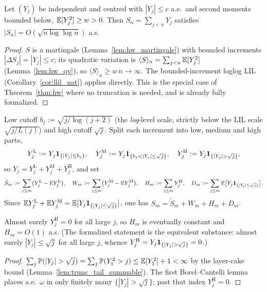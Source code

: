 \begin{corollary}\label{cor:hw_bounded}
Let $(Y_j)$ be independent and centred with $|Y_j|\le c$ a.e.\ and second moments bounded below,
$\mathbb{E}[Y_j^2]\ge w>0$. Then $S_n=\sum_{j<n}Y_j$ satisfies $|S_n|=O(\sqrt{n\log\log n})$ a.s.
\end{corollary}
\begin{proof}
$S$ is a martingale (Lemma~\ref{lem:hw_martingale}) with bounded increments $|\Delta S_j|=|Y_j|\le c$;
its quadratic variation is $\langle S\rangle_n=\sum_{j<n}\mathbb{E}[Y_j^2]$ (Lemma~\ref{lem:hw_qv}), so
$\langle S\rangle_n\ge w\,n\to\infty$. The bounded-increment loglog LIL
(Corollary~\ref{cor:llil_nat}) applies directly. This is the special case of
Theorem~\ref{thm:hw} where no truncation is needed, and is already fully formalized.
\end{proof}

\begin{definition}\label{def:hw_trunc}
Low cutoff $b_j:=\sqrt{j/\log(j+2)}$ (the \emph{log}-level scale, strictly below the LIL
scale $\sqrt{j/L(j)}$) and high cutoff $\sqrt j$. Split each increment into low, medium and
high parts,
\[
  Y_j^{\mathrm L}:=Y_j\indic_{\{|Y_j|\le b_j\}},\quad
  Y_j^{\mathrm M}:=Y_j\indic_{\{b_j<|Y_j|\le\sqrt j\}},\quad
  Y_j^{\mathrm H}:=Y_j\indic_{\{|Y_j|>\sqrt j\}},
\]
so $Y_j=Y_j^{\mathrm L}+Y_j^{\mathrm M}+Y_j^{\mathrm H}$, and set
\[
  \tilde S_m:=\sum_{j\le m}\!\big(Y_j^{\mathrm L}-\mathbb{E} Y_j^{\mathrm L}\big),\quad
  W_m:=\sum_{j\le m}\!\big(Y_j^{\mathrm M}-\mathbb{E} Y_j^{\mathrm M}\big),\quad
  H_m:=\sum_{j\le m}Y_j^{\mathrm H},\quad
  D_m:=\sum_{j\le m}\mathbb{E}\big[Y_j\mathbf{1}_{\{|Y_j|\le\sqrt j\}}\big].
\]
Since $\mathbb{E} Y_j^{\mathrm L}+\mathbb{E} Y_j^{\mathrm M}=\mathbb{E}[Y_j\mathbf{1}_{\{|Y_j|\le\sqrt j\}}]$, one has
$S_m=\tilde S_m+W_m+H_m+D_m$.
\end{definition}

\begin{lemma}\label{lem:hw_high}
\leanok
{}
Almost surely $Y_j^{\mathrm H}=0$ for all large $j$, so $H_m$ is eventually constant and
$H_m=O(1)$ a.s. (The formalized statement is the equivalent substance: almost surely
$|Y_j|\le\sqrt j$ for all large $j$, whence $Y_j^{\mathrm H}=Y_j\indic_{\{|Y_j|>\sqrt j\}}=0$.)
\end{lemma}
\begin{proof}\leanok
$\sum_j\Prob(|Y_j|>\sqrt j)=\sum_j\Prob(Y_1^2>j)\le\E[Y_1^2]+1<\infty$ by the layer-cake
bound (Lemma~\ref{lem:trunc_tail_summable}). The first Borel--Cantelli lemma places a.e.\
$\omega$ in only finitely many $\{|Y_j|>\sqrt j\}$; past that index $Y_j^{\mathrm H}=0$.
\end{proof}

